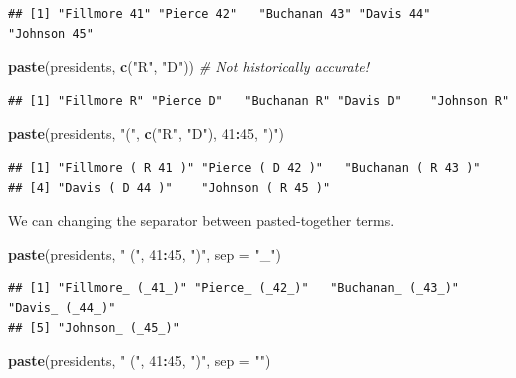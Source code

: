 \documentclass[
]{book}
\newenvironment{Shaded}{\begin{snugshade}}{\end{snugshade}}
\newcommand{\CommentTok}[1]{\textcolor[rgb]{0.56,0.35,0.01}{\textit{#1}}}
\newcommand{\DataTypeTok}[1]{\textcolor[rgb]{0.13,0.29,0.53}{#1}}
\newcommand{\DecValTok}[1]{\textcolor[rgb]{0.00,0.00,0.81}{#1}}
\newcommand{\KeywordTok}[1]{\textcolor[rgb]{0.13,0.29,0.53}{\textbf{#1}}}
\newcommand{\NormalTok}[1]{#1}
\newcommand{\OperatorTok}[1]{\textcolor[rgb]{0.81,0.36,0.00}{\textbf{#1}}}
\newcommand{\StringTok}[1]{\textcolor[rgb]{0.31,0.60,0.02}{#1}}
\begin{document}
\begin{verbatim}
## [1] "Fillmore 41" "Pierce 42"   "Buchanan 43" "Davis 44"    "Johnson 45"
\end{verbatim}

\begin{Shaded}
\begin{Highlighting}[]
\KeywordTok{paste}\NormalTok{(presidents, }\KeywordTok{c}\NormalTok{(}\StringTok{"R"}\NormalTok{, }\StringTok{"D"}\NormalTok{))  }\CommentTok{# Not historically accurate!}
\end{Highlighting}
\end{Shaded}

\begin{verbatim}
## [1] "Fillmore R" "Pierce D"   "Buchanan R" "Davis D"    "Johnson R"
\end{verbatim}

\begin{Shaded}
\begin{Highlighting}[]
\KeywordTok{paste}\NormalTok{(presidents, }\StringTok{"("}\NormalTok{, }\KeywordTok{c}\NormalTok{(}\StringTok{"R"}\NormalTok{, }\StringTok{"D"}\NormalTok{), }\DecValTok{41}\OperatorTok{:}\DecValTok{45}\NormalTok{, }\StringTok{")"}\NormalTok{)}
\end{Highlighting}
\end{Shaded}

\begin{verbatim}
## [1] "Fillmore ( R 41 )" "Pierce ( D 42 )"   "Buchanan ( R 43 )"
## [4] "Davis ( D 44 )"    "Johnson ( R 45 )"
\end{verbatim}

We can changing the separator between pasted-together terms.

\begin{Shaded}
\begin{Highlighting}[]
\KeywordTok{paste}\NormalTok{(presidents, }\StringTok{" ("}\NormalTok{, }\DecValTok{41}\OperatorTok{:}\DecValTok{45}\NormalTok{, }\StringTok{")"}\NormalTok{, }\DataTypeTok{sep =} \StringTok{"_"}\NormalTok{)}
\end{Highlighting}
\end{Shaded}

\begin{verbatim}
## [1] "Fillmore_ (_41_)" "Pierce_ (_42_)"   "Buchanan_ (_43_)" "Davis_ (_44_)"   
## [5] "Johnson_ (_45_)"
\end{verbatim}

\begin{Shaded}
\begin{Highlighting}[]
\KeywordTok{paste}\NormalTok{(presidents, }\StringTok{" ("}\NormalTok{, }\DecValTok{41}\OperatorTok{:}\DecValTok{45}\NormalTok{, }\StringTok{")"}\NormalTok{, }\DataTypeTok{sep =} \StringTok{""}\NormalTok{)}
\end{Highlighting}
\end{Shaded}
\end{document}
